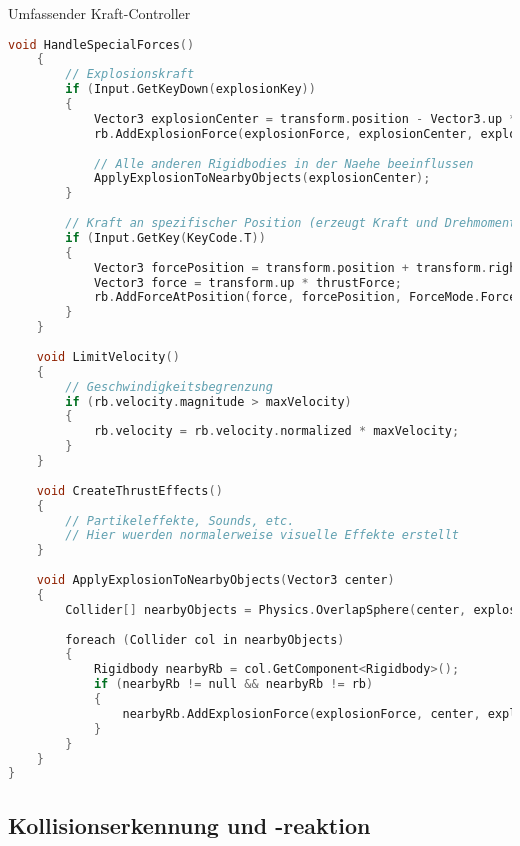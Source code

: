 \begin{code}{Umfassender Kraft-Controller}
\begin{lstlisting}[language=C, style=basesmol]
    void HandleSpecialForces() 
    {
        // Explosionskraft
        if (Input.GetKeyDown(explosionKey)) 
        {
            Vector3 explosionCenter = transform.position - Vector3.up * 2f;
            rb.AddExplosionForce(explosionForce, explosionCenter, explosionRadius, 3f);
            
            // Alle anderen Rigidbodies in der Naehe beeinflussen
            ApplyExplosionToNearbyObjects(explosionCenter);
        }
        
        // Kraft an spezifischer Position (erzeugt Kraft und Drehmoment)
        if (Input.GetKey(KeyCode.T)) 
        {
            Vector3 forcePosition = transform.position + transform.right;
            Vector3 force = transform.up * thrustForce;
            rb.AddForceAtPosition(force, forcePosition, ForceMode.Force);
        }
    }
    
    void LimitVelocity() 
    {
        // Geschwindigkeitsbegrenzung
        if (rb.velocity.magnitude > maxVelocity) 
        {
            rb.velocity = rb.velocity.normalized * maxVelocity;
        }
    }
    
    void CreateThrustEffects() 
    {
        // Partikeleffekte, Sounds, etc.
        // Hier wuerden normalerweise visuelle Effekte erstellt
    }
    
    void ApplyExplosionToNearbyObjects(Vector3 center) 
    {
        Collider[] nearbyObjects = Physics.OverlapSphere(center, explosionRadius);
        
        foreach (Collider col in nearbyObjects) 
        {
            Rigidbody nearbyRb = col.GetComponent<Rigidbody>();
            if (nearbyRb != null && nearbyRb != rb) 
            {
                nearbyRb.AddExplosionForce(explosionForce, center, explosionRadius);
            }
        }
    }
}
\end{lstlisting}
\end{code}

\subsection{Kollisionserkennung und -reaktion}

